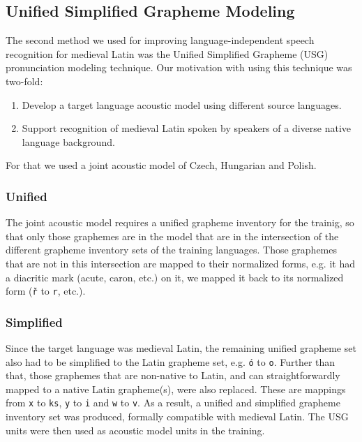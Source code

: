 \documentclass[runningheads,a4paper]{llncs}
\begin{document}
\subsection{Unified Simplified Grapheme Modeling}\label{usg}
The second method we used for improving language-independent speech recognition for medieval Latin was the Unified Simplified Grapheme (USG) pronunciation modeling technique.
Our motivation with using this technique was two-fold:
\begin{enumerate}
\item Develop a target language acoustic model using different source languages.
\item Support recognition of medieval Latin spoken by speakers of a diverse native language background.
\end{enumerate}
For that we used a joint acoustic model of Czech, Hungarian and Polish.
\subsubsection{Unified}
The joint acoustic model requires a unified grapheme inventory for the trainig, so that only those graphemes are in the model that are in the intersection of the different grapheme inventory sets of the training languages.
Those graphemes that are not in this intersection are mapped to their normalized forms, e.g. it had a diacritic mark (acute, caron, etc.) on it, we mapped it back to its normalized form (\texttt{\v{r}} to \texttt{r}, etc.).
\subsubsection{Simplified}\label{simplified}
Since the target language was medieval Latin, the remaining unified grapheme set also had to be simplified to the Latin grapheme set, e.g. \texttt{\'{o}} to \texttt{o}.
Further than that, those graphemes that are non-native to Latin, and can straightforwardly mapped to a native Latin grapheme(s), were also replaced.
These are mappings from \texttt{x} to \texttt{ks}, \texttt{y} to \texttt{i} and \texttt{w} to \texttt{v}.
As a result, a unified and simplified grapheme inventory set was produced, formally compatible with medieval Latin.
The USG units were then used as acoustic model units in the training.
\end{document}
